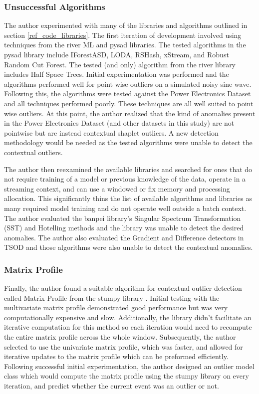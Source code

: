 \subsubsection{Unsuccessful Algorithms}

The author experimented with many of the libraries and algorithms outlined in section \ref{ref_code_libraries}. The first iteration of development involved using techniques from the river ML \cite{2020river} and pysad \cite{pysad} libraries.  The tested algorithms in the pysad library include IForestASD, LODA, RSHash, xStream, and Robust Random Cut Forest. The tested (and only) algorithm from the river library includes Half Space Trees. Initial experimentation was performed and the algorithms performed well for point wise outliers on a simulated noisy sine wave. Following this, the algorithms were tested against the Power Electronics Dataset and all techniques performed poorly. These techniques are all well suited to point wise outliers. At this point, the author realized that the kind of anomalies present in the Power Electronics Dataset (and other datasets in this study) are not pointwise but are instead contextual shaplet outliers. A new detection methodology would be needed as the tested algorithms were unable to detect the contextual outliers.

The author then reexamined the available libraries and searched for ones that do not require training of a model or previous knowledge of the data, operate in a streaming context, and can use a windowed or fix memory and processing allocation. This significantly thins the list of available algorithms and libraries as many required model training and do not operate well outside a batch context. The author evaluated the banpei \cite{banpei} library's Singular Spectrum Transformation (SST) and Hotelling methods and the library was unable to detect the desired anomalies. The author also evaluated the Gradient and Difference detectors in TSOD \cite{tsod} and those algorithms were also unable to detect the contextual anomalies.

\subsubsection{Matrix Profile}

Finally, the author found a suitable algorithm for contextual outlier detection called Matrix Profile from the stumpy library \cite{law2019stumpy}. Initial testing with the multivariate matrix profile demonstrated good performance but was very computationally expensive and slow. Additionally, the library didn't facilitate an iterative computation for this method so each iteration would need to recompute the entire matrix profile across the whole window. Subsequently, the author selected to use the univariate matrix profile, which was faster, and allowed for iterative updates to the matrix profile which can be preformed efficiently. Following successful initial experimentation, the author designed an outlier model class which would compute the matrix profile using the stumpy library on every iteration, and predict whether the current event was an outlier or not. 

